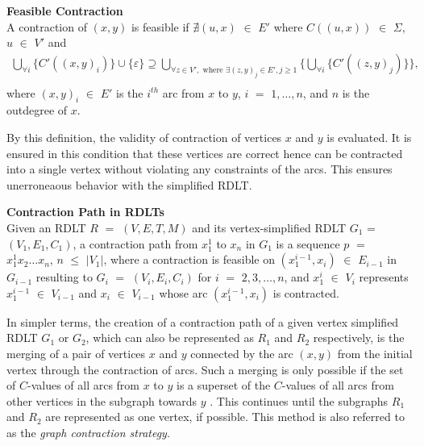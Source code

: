 \begin{defn}\textbf{Feasible Contraction} \cite{Malinao2017}\\
    A contraction of $ (x,y) $ is feasible if $ \nexists (u,x) $ $ \in $ $ E' $ where $ C((u,x)) $ $ \in $ $ \Sigma $, $ u $ $ \in $ $ V' $ and\\
    \begin{gather*}
        \bigcup\limits_{\forall i}\{ C'((x,y)_i) \} \cup \{\varepsilon\} \supseteq \bigcup\limits_{\forall z \in V', \text{ where } \exists(z,y)_j \in E', j \geq 1 } \{ \bigcup\limits_{\forall i}\{ C'((z,y)_j) \} \},\\
    \end{gather*}
    where $ (x,y)_i $ $ \in $ $ E' $ is the $ i^{th} $ arc from $ x $ to $ y $, $ i $ $ = $ $ 1, \ldots, n $, and $ n $ is the outdegree of $ x $.
\end{defn}

By this definition, the validity of contraction of vertices $x$ and $y$ is evaluated. It is ensured in this condition that these vertices are correct hence can be contracted into a single vertex without violating any constraints of the arcs. This ensures unerroneaous behavior with the simplified RDLT.

\begin{defn}\textbf{Contraction Path in RDLTs} \cite{Malinao2017}\\
    \label{contractionPath}
    Given an RDLT $ R $ $ = $ $ (V,E,T,M) $ and its vertex-simplified RDLT $ G_1 $ = $ (V_1,E_1,C_1) $, a contraction path from $ x_1^1 $ to $ x_n $ in $ G_1 $ is a sequence $ p $ $ = $ $ x_1^1 x_2 \ldots x_n $, $ n $ $ \leq $ $ |V_1| $, where a contraction is feasible on $ (x_1^{i-1},x_i) $ $ \in $ $ E_{i-1} $ in $ G_{i-1} $ resulting to $ G_i $ $ = $ $ (V_i,E_i,C_i) $ for $ i $ $ = $ $ 2, 3, \ldots, n $, and $ x_1^i $ $ \in $ $ V_i $ represents $ x_1^{i-1} $ $ \in $ $ V_{i-1} $ and $ x_i $ $ \in $ $ V_{i-1} $ whose arc $ (x_1^{i-1},x_i) $ is contracted.
\end{defn}
In simpler terms, the creation of a contraction path of a given vertex simplified RDLT $ G_1 $ or $ G_2 $, which can also be represented as $R_1$ and $R_2$ respectively, is the merging of a pair of vertices $ x $ and $ y $ connected by the arc $ (x,y) $ from the initial vertex through the contraction of arcs. Such a merging is only possible if the set of $C$-values of all arcs from $ x $ to $ y $ is a superset of the $C$-values of all arcs from other vertices in the subgraph towards $ y $ \cite{MalinaoWCTP2023}. This continues until the subgraphs $ R_1 $ and $ R_2 $ are represented as one vertex, if possible. This method is also referred to as the \emph{graph contraction strategy}.

